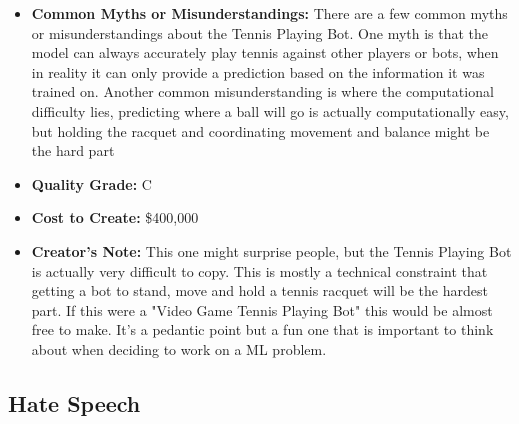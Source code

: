 \begin{itemize}
    \item \textbf{Common Myths or Misunderstandings:} There are a few common myths or misunderstandings about the Tennis Playing Bot. One myth is that the model can always accurately play tennis against other players or bots, when in reality it can only provide a prediction based on the information it was trained on. Another common misunderstanding is where the computational difficulty lies, predicting where a ball will go is actually computationally easy, but holding the racquet and coordinating movement and balance might be the hard part 
    \item \textbf{Quality Grade:} C
    \item \textbf{Cost to Create:} \$400,000
    \item \textbf{Creator's Note:} This one might surprise people, but the Tennis Playing Bot is actually very difficult to copy. This is mostly a technical constraint that getting a bot to stand, move and hold a tennis racquet will be the hardest part. If this were a "Video Game Tennis Playing Bot" this would be almost free to make. It's a pedantic point but a fun one that is important to think about when deciding to work on a ML problem.
\end{itemize}


\subsection{Hate Speech}

